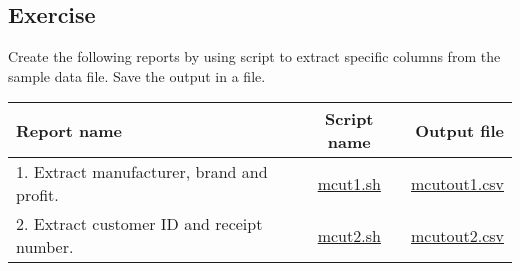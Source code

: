 \newpage
\subsection{Exercise }

Create the following reports by using script to extract specific columns from the sample data file. Save the output in a file.

\begin{table}[htbp]
{\small
\begin{tabular}{ l | c || r }
\hline
\textbf{Report name}   & \textbf{Script name} & \textbf{Output file}  \\
\hline
1. Extract manufacturer, brand and profit. & \href{exercise/mcut1.sh}{mcut1.sh} & \href{exercise/outdat/mcutout1.csv}{mcutout1.csv} \\
2. Extract customer ID and receipt number. & \href{exercise/mcut2.sh}{mcut2.sh} & \href{exercise/outdat/mcutout2.csv}{mcutout2.csv} \\
\hline
\end{tabular} 
}
\end{table} 


%
